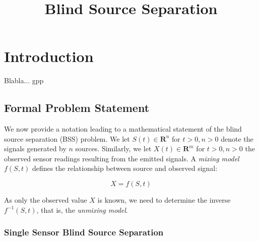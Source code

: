 \documentclass[11pt, oneside, a4paper]{report}
\begin{document}

\title{Blind Source Separation}
\author{}
\date{}    %
\maketitle

\begin{abstract}

\end{abstract}

\tableofcontents

\chapter{Introduction}

Blabla... gpp

\section{Formal Problem Statement}

We now provide a notation leading to a mathematical statement of the blind source separation (BSS) problem. We let $S(t)\in \mathbf{R}^n$ for $t>0, n>0$ denote the signals generated by $n$ sources. Similarly, we let $X(t)\in \mathbf{R}^m$ for $t>0, n>0$ the observed sensor readings resulting from the emitted signals. A \emph{mixing model} $f(S,t)$ defines the relationship between source and observed signal:

\begin{equation}\label{mixing_model}
  X = f(S,t)
\end{equation}

As only the observed value $X$ is known, we need to determine the inverse $f^{-1}(S,t)$, that is, the \emph{unmixing model}.

\subsection{Single Sensor Blind Source Separation}
\end{document}
